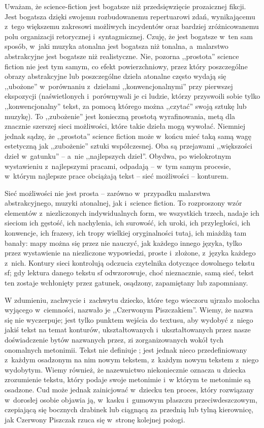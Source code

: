 \documentclass[oneside,polish,11pt,rmheadings]{mwbk}
\begin{document}
Uważam, że science-fiction jest bogatsze niż przedsięwzięcie prozaicznej fikcji. Jest bogatsza dzięki swojemu rozbudowanemu repertuarowi zdań, wynikającemu z~tego większemu zakresowi możliwych incydentów oraz bardziej zróżnicowanemu polu organizacji retorycznej i~syntagmicznej. Czuję, że jest bogatsze w~ten sam sposób, w~jaki muzyka atonalna jest bogatsza niż tonalna, a~malarstwo abstrakcyjne jest bogatsze niż realistyczne. Nie, pozorna ,,prostota'' science fiction nie jest tym samym, co efekt powierzchniowy, przez który poszczególne obrazy abstrakcyjne lub poszczególne dzieła atonalne często wydają się ,,ubożone'' w~porównaniu z~dziełami ,,konwencjonalnymi'' przy pierwszej ekspozycji (naświetlonych i~porównywali je ci ludzie, którzy przyswoili sobie tylko ,,konwencjonalny'' tekst, za pomocą którego można ,,czytać'' swoją sztukę lub muzykę). To ,,zubożenie'' jest konieczną prostotą wyrafinowania, metą dla znacznie szerszej sieci możliwości, które takie dzieła mogą wywołać. Niemniej jednak sądzę, że ,,prostota'' science fiction może w~końcu mieć taką samą wagę estetyczną jak ,,zubożenie'' sztuki współczesnej. Oba są przejawami ,,większości dzieł w~gatunku'' -- a~nie ,,najlepszych dzieł''. Obydwa, po wielokrotnym wystawieniu z~najlepszymi pracami, odpadają -- w~tym samym procesie, w~którym najlepsze prace obciążają tekst -- sieć możliwości -- konturem. 

Sieć możliwości nie jest prosta -- zarówno w~przypadku malarstwa abstrakcyjnego, muzyki atonalnej, jak i~science fiction. To rozproszony wzór elementów z~niezliczonych indywidualnych form, we wszystkich trzech, nadaje ich sieciom ich gęstość, ich nachylenia, ich surowość, ich uroki, ich przyległości, ich konwencje, ich frazesy, ich tropy wielkiej oryginalności tutaj, ich miażdżą tam banały: mapy można się przez nie nauczyć, jak każdego innego języka, tylko przez wystawienie na niezliczone wypowiedzi, proste i~złożone, z~języka każdego z~nich. Kontury sieci kontrolują odczucia czytelnika dotyczące dowolnego tekstu sf; gdy lektura danego tekstu sf odwzorowuje, choć nieznacznie, samą sieć, tekst ten zostaje wchłonięty przez gatunek, osądzony, zapamiętany lub zapomniany. 

W zdumieniu, zachwycie i~zachwytu dziecko, które tego wieczoru ujrzało molocha wyjącego w~ciemności, nazwało je ,,Czerwonym Piszczakiem''. Wiemy, że nazwa się nie wyczerpuje; jest tylko punktem wejścia do textusu, aby wydobyć z~niego jakiś tekst na temat konturów, ukształtowanych i~ukształtowanych przez nasze doświadczenie bytów nazwanych przez, zi zorganizowanych wokół tych onomalnych metonimii. Tekst nie definiuje ; jest jednak nieco przedefiniowany z~każdym osadzonym na nim nowym tekstem, z~każdym nowym tekstem z~niego wydobytym. Wiemy również, że nazewnictwo niekoniecznie oznacza u dziecka zrozumienie tekstu, który podaje swoje metonimie i~w którym te metonimie są osadzone. Cud może jednak zainicjować w~dziecku ten proces, który rozwiązany w~dorosłej osobie objawia ją, w~kasku i~gumowym płaszczu przeciwdeszczowym, czepiającą się bocznych drabinek lub ciągnącą za przednią lub tylną kierownicę, jak Czerwony Piszczak rzuca się w~stronę kolejnej pożogi. 
\end{document}
